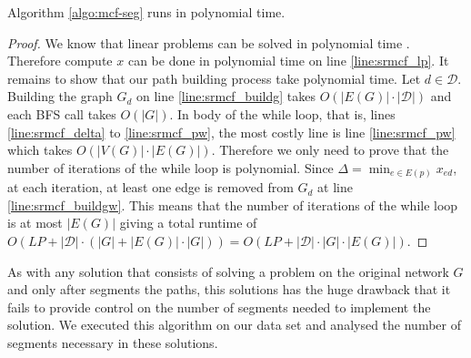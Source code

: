 \begin{proposition}
Algorithm \ref{algo:mcf-seg} runs in polynomial time.
\end{proposition}

\begin{proof}
We know that linear problems can be solved in polynomial time . Therefore compute $x$ can be done in polynomial time on line \ref{line:srmcf_lp}.
It remains to show that our path building process take polynomial time. Let $d \in \mathcal{D}$. Building the graph $G_d$ on line \ref{line:srmcf_buildg} takes
$O(|E(G)| \cdot |\mathcal{D}|)$ and each \textsf{BFS} call takes $O(|G|)$. In body of the while loop, that is, lines \ref{line:srmcf_delta}
to \ref{line:srmcf_pw}, the most costly line is line \ref{line:srmcf_pw} which takes $O(|V(G)| \cdot |E(G)|)$. Therefore we only need to prove that the number 
of iterations of the while loop is polynomial. Since $\Delta = \min_{e \in E(p)} x_{ed}$, at each iteration, at least one edge is removed from $G_d$ at
line \ref{line:srmcf_buildgw}. This means that the number of iterations of the while loop is at most $|E(G)|$ giving a total runtime of
$O(LP + |\mathcal{D}| \cdot (|G| + |E(G)| \cdot |G|)) = O(LP + |\mathcal{D}| \cdot |G| \cdot |E(G)|)$.
\end{proof}


As with any solution that consists of solving a problem on the original network $G$ and only after segments the paths,
this solutions has the huge drawback that it fails to provide control on the number of segments needed to implement the 
solution. We executed this algorithm on our data set and analysed the number of segments necessary in these solutions.

